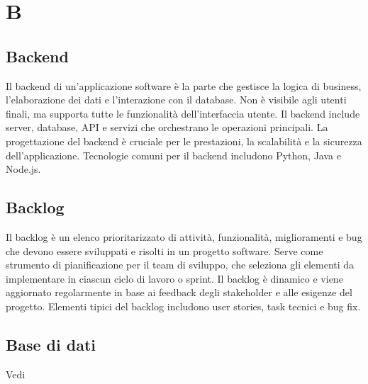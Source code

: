 \section{B}

\vspace{2em}
\subsection*{Backend}
\par Il backend di un'applicazione software è la parte che gestisce la logica di business, l'elaborazione dei dati e l'interazione con il database. Non è visibile agli utenti finali, ma supporta tutte le funzionalità dell'interfaccia utente. Il backend include server, database, API e servizi che orchestrano le operazioni principali. La progettazione del backend è cruciale per le prestazioni, la scalabilità e la sicurezza dell'applicazione. Tecnologie comuni per il backend includono Python, Java e Node.js.

\vspace{2em}
\subsection*{Backlog}
\par Il backlog è un elenco prioritarizzato di attività, funzionalità, miglioramenti e bug che devono essere sviluppati e risolti in un progetto software. Serve come strumento di pianificazione per il team di sviluppo, che seleziona gli elementi da implementare in ciascun ciclo di lavoro o sprint. Il backlog è dinamico e viene aggiornato regolarmente in base ai feedback degli stakeholder e alle esigenze del progetto. Elementi tipici del backlog includono user stories, task tecnici e bug fix.

\vspace{2em}
\subsection*{Base di dati}
\par Vedi 

